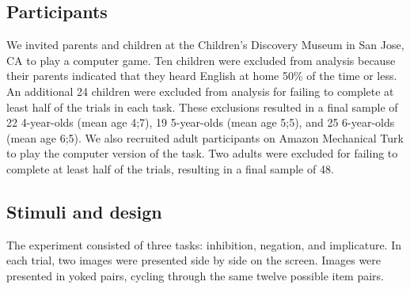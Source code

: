 \documentclass[10pt,letterpaper]{article}
\newcommand{\aen}[1]{\textcolor{DarkOrange}{[aen: #1]}}
\begin{document}

\subsection{Participants}

We invited parents and children at the Children's Discovery Museum in San Jose, CA to play a computer game. Ten children were excluded from analysis because their parents indicated that they heard English at home 50\% of the time or less. An additional 24 children were excluded from analysis for failing to complete at least half of the trials in each task. These exclusions resulted in a final sample of 22 4-year-olds (mean age 4;7), 19 5-year-olds (mean age 5;5), and 25 6-year-olds (mean age 6;5). We also recruited adult participants on Amazon Mechanical Turk to play the computer version of the task. Two adults were excluded for failing to complete at least half of the trials, resulting in a final sample of 48.

\subsection{Stimuli and design}

The experiment consisted of three tasks: inhibition, negation, and implicature. In each trial, two images were presented side by side on the screen. Images were presented in yoked pairs, cycling through the same twelve possible item pairs. 
\end{document}

